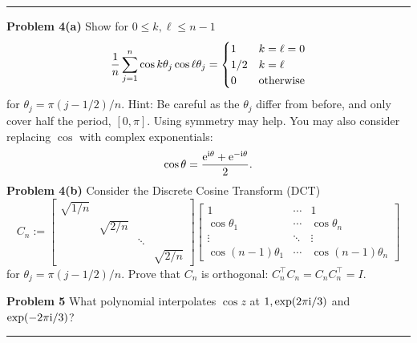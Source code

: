 \documentclass[12pt,a4paper]{article}
\begin{document}
\rule{\textwidth}{1pt}
\textbf{Problem 4(a)} Show for $0 \ensuremath{\leq} k,\ensuremath{\ell} \ensuremath{\leq} n-1$
\[
{1 \over n} \ensuremath{\sum}_{j=1}^n \cos k \ensuremath{\theta}_j \cos \ensuremath{\ell} \ensuremath{\theta}_j = \begin{cases} 1 & k = \ensuremath{\ell} = 0 \\
                                                  1/2 & k = \ensuremath{\ell} \\
                                                  0 & \hbox{otherwise}
                                                  \end{cases}
\]
for $\ensuremath{\theta}_j = \ensuremath{\pi}(j-1/2)/n$. Hint: Be careful as the $\ensuremath{\theta}_j$ differ from before, and only cover half the period, $[0,\ensuremath{\pi}]$. Using symmetry may help. You may also consider replacing $\cos$ with complex exponentials:
\[
\cos \ensuremath{\theta} = {{\rm e}^{{\rm i}\ensuremath{\theta}} + {\rm e}^{-{\rm i}\ensuremath{\theta}} \over 2}.
\]
\textbf{Problem 4(b)} Consider the Discrete Cosine Transform (DCT)
\[
C_n := \begin{bmatrix}
\sqrt{1/n} \\
 & \sqrt{2/n} \\
 && \ensuremath{\ddots} \\
 &&& \sqrt{2/n}
 \end{bmatrix}
\begin{bmatrix}
    1 & \ensuremath{\cdots} & 1\\
    \cos \ensuremath{\theta}_1 & \ensuremath{\cdots} & \cos \ensuremath{\theta}_n \\
    \ensuremath{\vdots} & \ensuremath{\ddots} & \ensuremath{\vdots} \\
    \cos (n-1)\ensuremath{\theta}_1 & \ensuremath{\cdots} & \cos (n-1)\ensuremath{\theta}_n
\end{bmatrix}
\]
for $\ensuremath{\theta}_j = \ensuremath{\pi}(j-1/2)/n$. Prove that $C_n$ is orthogonal: $C_n^\ensuremath{\top} C_n = C_n C_n^\ensuremath{\top} = I$.

\textbf{Problem 5} What polynomial interpolates $\cos z$ at $1, \exp(2\pi{\rm i}/3)$ and $\exp(-2\pi{\rm i}/3)$?

\rule{\textwidth}{1pt}
\end{document}
